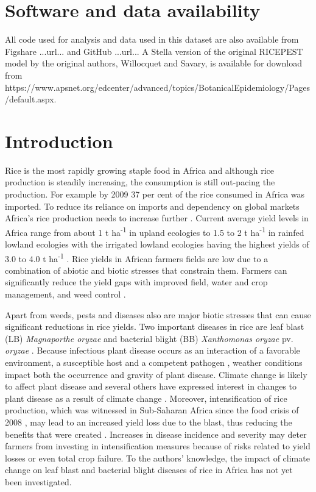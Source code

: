 \documentclass[preprint,12pt]{elsarticle}
\begin{document}
\linenumbers

\section{Software and data availability}
All code used for analysis and data used in this dataset are also available from Figshare ...url... and GitHub ...url... A Stella version of the original RICEPEST model by the original authors, Willocquet and Savary, is available for download from\\https://www.apsnet.org/edcenter/advanced/topics/BotanicalEpidemiology/Pages/default.aspx.


\section{Introduction}
Rice is the most rapidly growing staple food in Africa and although rice production is steadily increasing, the consumption is still out-pacing the production. For example by 2009 37 per cent of the rice consumed in Africa was imported. To reduce its reliance on imports and dependency on global markets Africa's rice production needs to increase further \cite{Seck2013}. Current average yield levels in Africa range from about 1 t ha\textsuperscript{-1} in upland ecologies to 1.5 to 2 t ha\textsuperscript{-1} in rainfed lowland ecologies with the irrigated lowland ecologies having the highest yields of 3.0 to 4.0 t ha\textsuperscript{-1} \cite{Diagne2013}. Rice yields in African farmers fields are low due to a combination of abiotic and biotic stresses that constrain them. Farmers can significantly reduce the yield gaps with improved field, water and crop management, and weed control \cite{Saito2013}.

Apart from weeds, pests and diseases also are major biotic stresses that can cause significant reductions in rice yields. Two important diseases in rice are leaf blast (LB) \textit{Magnaporthe oryzae} and bacterial blight (BB) \textit{Xanthomonas oryzae} pv. \textit{oryzae} \cite{Verdier2012}. Because infectious plant disease occurs as an interaction of a favorable environment, a susceptible host and a competent pathogen \cite{Madden2007}, weather conditions impact both the occurrence and gravity of plant disease. Climate change is likely to affect plant disease \cite{Anderson2004, Coakley1999, Garrett2006} and several others have expressed interest in changes to plant disease as a result of climate change \cite{Chakraborty2011, Juroszek2011, Luck2011, Pautasso2010, Savary2011, Sutherst2011}. Moreover, intensification of rice production, which was witnessed in Sub-Saharan Africa since the food crisis of 2008 \cite{Saito2013}, may lead to an increased yield loss due to the blast, thus reducing the benefits that were created \cite{Sere2013}. Increases in disease incidence and severity may deter farmers from investing in intensification measures because of risks related to yield losses or even total crop failure. To the authors' knowledge, the impact of climate change on leaf blast and bacterial blight diseases of rice in Africa has not yet been investigated.
\end{document}

